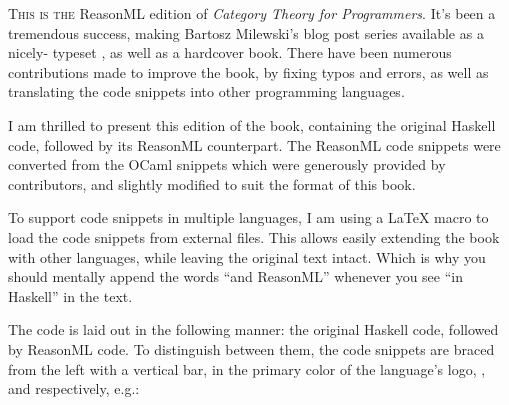 
\lettrine[lhang=0.17]{T}{his is the} ReasonML edition of \emph{Category Theory for Programmers}.
It's been a tremendous success, making Bartosz Milewski's blog post series available as a nicely-
typeset , as well as a hardcover book. There have been numerous contributions made
to improve the book, by fixing typos and errors, as well as translating the code snippets into
other programming languages.

I am thrilled to present this edition of the book, containing the original Haskell code, followed by
its ReasonML counterpart. The ReasonML code snippets were converted from the OCaml snippets which were
generously provided by  contributors,
and slightly modified to suit the format of this book.

To support code snippets in multiple languages, I am using a \LaTeX{} macro to load the code snippets
from external files. This allows easily extending the book with other languages, while leaving the
original text intact. Which is why you should mentally append the words ``and ReasonML'' whenever you see
``in Haskell'' in the text.

The code is laid out in the following manner: the original Haskell code, followed by ReasonML code.
To distinguish between them, the code snippets are braced from the left with a vertical bar, in the primary
color of the language's logo, ,
and  respectively, e.g.:

\unskip
{}
\NoIndentAfterThis